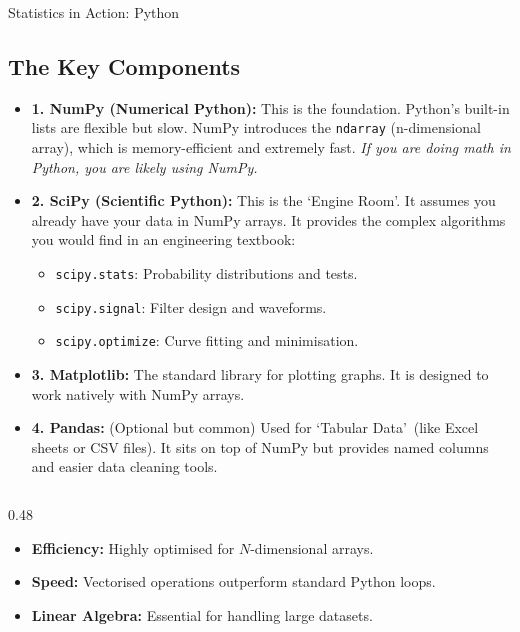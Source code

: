 \begin{frame}{Statistics in Action: Python}
{        \subsection{The Key Components}
        \begin{itemize}
            \item \textbf{1. NumPy (Numerical Python):} This is the foundation. Python's built-in lists are flexible but slow. NumPy introduces the \texttt{ndarray} (n-dimensional array), which is memory-efficient and extremely fast. \textit{If you are doing math in Python, you are likely using NumPy.}
            \item \textbf{2. SciPy (Scientific Python):} This is the \lq Engine Room\rq . It assumes you already have your data in NumPy arrays. It provides the complex algorithms you would find in an engineering textbook:
            \begin{itemize}
                \item \texttt{scipy.stats}: Probability distributions and tests.
                \item \texttt{scipy.signal}: Filter design and waveforms.
                \item \texttt{scipy.optimize}: Curve fitting and minimisation.
            \end{itemize}
            \item \textbf{3. Matplotlib:} The standard library for plotting graphs. It is designed to work natively with NumPy arrays.
            \item \textbf{4. Pandas:} (Optional but common) Used for \lq Tabular Data\rq\ (like Excel sheets or CSV files). It sits on top of NumPy but provides named columns and easier data cleaning tools.
        \end{itemize}
    }

    \vspace{0.3cm}

    \begin{columns}[T]
        \begin{column}{0.48\textwidth}
            \begin{itemize}
                \item \textbf{Efficiency:} Highly optimised for $N$-dimensional arrays.
                \item \textbf{Speed:} Vectorised operations outperform standard Python loops.
                \item \textbf{Linear Algebra:} Essential for handling large datasets.
            \end{itemize}
        \end{column}
        

\end{columns}
\end{frame}
